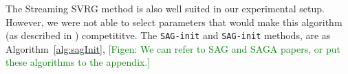 \documentclass[11pt]{article}
\begin{document}
The Streaming SVRG method  is also well suited in our experimental setup. However, we were not able to select parameters that would make this algorithm (as described in \cite{frostig2014competing}) competititve. 
The \texttt{SAG-init} and \texttt{SAG-init} methods, are as Algorithm~\ref{alg:sagInit}, \textcolor{green}{[Figen: We can refer to SAG and SAGA papers, or put these algorithms to the appendix.]}

% 
\end{document}
